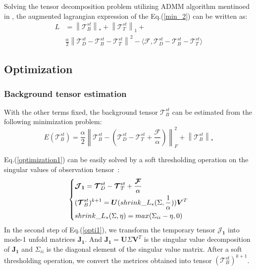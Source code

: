\documentclass[journal]{IEEEtran}
\begin{document}
Solving the tensor decomposition problem utilizing ADMM algorithm mentinoed in \cite{dai2017reweighted}, the augmented lagrangian expression of the Eq.(\ref{min_2}) can be written as:
\begin{equation}
  \begin{split}
    L & = \left \|\bm{\mathcal T}_B^{st} \right \| _* +\left \|\bm{\mathcal T}_T^{st} \right \| _1 + \\
    & \frac{\alpha}{2} \left \|\bm{\mathcal T}_D^{st}-\bm{\mathcal T}_B^{st}-\bm{\mathcal T}_T^{st} \right \| ^2 - \langle \bm{\mathcal F},\bm{\mathcal T}_D^{st}-\bm{\mathcal T}_B^{st}-\bm{\mathcal T}_T^{st} \rangle
  \end{split}
\end{equation}

\subsection{Optimization}
\subsubsection{Background tensor estimation}
With the other terms fixed, the background tensor $\bm{\mathcal T}_B^{st}$ can be estimated from the following minimization problem:
\begin{equation}
  E(\bm{\mathcal T}_B^{st})=\frac{\alpha}{2} \left \|\bm{\mathcal T}_B^{st}-(\bm{\mathcal T}_D^{st}-\bm{\mathcal T}_T^{st}+\frac{\bm{\mathcal F}}{\alpha}) \right \|_F^2 + \left \|\bm{\mathcal T}_B^{st} \right \| _*
  \label{optimization1}
\end{equation}

Eq.(\ref{optimization1}) can be easily solved by a soft thresholding operation on the singular values of observation tensor~\cite{cai2010singular}:
\begin{equation}
  \begin{dcases}
    \bm{\mathcal J_1}=\bm{\mathcal T}_D^{st}-\bm{\mathcal T}_T^{st}+\frac{\bm{\mathcal F}}{\alpha}\\
    (\bm{\mathcal T}_B^{st})^{k+1}=\bm{U}(shrink\_L_{*}(\Sigma,\frac{1}{\alpha}))\bm{V}^{T}\\
    shrink\_L_{*}(\Sigma,\eta)=max(\Sigma_{ii}-\eta,0)
  \end{dcases}
  \label{opti1}
\end{equation}
In the second step of Eq.(\ref{opti1}), we transform the temporary tensor $\bm{\mathcal J_1}$ into mode-1 unfold matrices $\bm{J_1}$. And $\bm{J_1}=\bm{U}\Sigma\bm{V}^{T}$ is the singular value decomposition of $\bm{J_1}$ and $\Sigma_{ii}$ is the diagonal element of the singular value matrix. After a soft thresholding operation, we convert the metrices obtained into tensor $(\bm{\mathcal T}_B^{st})^{k+1}$.
\end{document}
